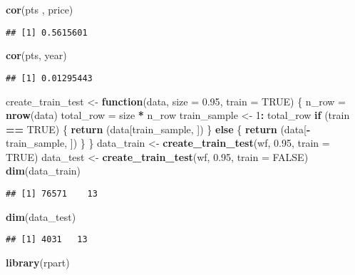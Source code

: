 \documentclass[
]{article}
\newenvironment{Shaded}{\begin{snugshade}}{\end{snugshade}}
\newcommand{\ControlFlowTok}[1]{\textcolor[rgb]{0.13,0.29,0.53}{\textbf{#1}}}
\newcommand{\DataTypeTok}[1]{\textcolor[rgb]{0.13,0.29,0.53}{#1}}
\newcommand{\DecValTok}[1]{\textcolor[rgb]{0.00,0.00,0.81}{#1}}
\newcommand{\FloatTok}[1]{\textcolor[rgb]{0.00,0.00,0.81}{#1}}
\newcommand{\KeywordTok}[1]{\textcolor[rgb]{0.13,0.29,0.53}{\textbf{#1}}}
\newcommand{\NormalTok}[1]{#1}
\newcommand{\OperatorTok}[1]{\textcolor[rgb]{0.81,0.36,0.00}{\textbf{#1}}}
\newcommand{\OtherTok}[1]{\textcolor[rgb]{0.56,0.35,0.01}{#1}}
\newcommand{\StringTok}[1]{\textcolor[rgb]{0.31,0.60,0.02}{#1}}
\begin{document}
\begin{Shaded}
\begin{Highlighting}[]
\KeywordTok{cor}\NormalTok{(pts , price)}
\end{Highlighting}
\end{Shaded}

\begin{verbatim}
## [1] 0.5615601
\end{verbatim}

\begin{Shaded}
\begin{Highlighting}[]
\KeywordTok{cor}\NormalTok{(pts, year)}
\end{Highlighting}
\end{Shaded}

\begin{verbatim}
## [1] 0.01295443
\end{verbatim}

\begin{Shaded}
\begin{Highlighting}[]
\NormalTok{create_train_test <-}\StringTok{ }\ControlFlowTok{function}\NormalTok{(data, }\DataTypeTok{size =} \FloatTok{0.95}\NormalTok{, }\DataTypeTok{train =} \OtherTok{TRUE}\NormalTok{) \{}
\NormalTok{     n_row =}\StringTok{ }\KeywordTok{nrow}\NormalTok{(data)}
\NormalTok{     total_row =}\StringTok{ }\NormalTok{size }\OperatorTok{*}\StringTok{ }\NormalTok{n_row}
\NormalTok{     train_sample <-}\StringTok{ }\DecValTok{1}\OperatorTok{:}\StringTok{ }\NormalTok{total_row}
     \ControlFlowTok{if}\NormalTok{ (train }\OperatorTok{==}\StringTok{ }\OtherTok{TRUE}\NormalTok{) \{}
         \KeywordTok{return}\NormalTok{ (data[train_sample, ])}
\NormalTok{     \} }\ControlFlowTok{else}\NormalTok{ \{}
         \KeywordTok{return}\NormalTok{ (data[}\OperatorTok{-}\NormalTok{train_sample, ])}
\NormalTok{     \}}
\NormalTok{ \}}
\NormalTok{data_train <-}\StringTok{ }\KeywordTok{create_train_test}\NormalTok{(wf, }\FloatTok{0.95}\NormalTok{, }\DataTypeTok{train =} \OtherTok{TRUE}\NormalTok{)}
\NormalTok{data_test <-}\StringTok{ }\KeywordTok{create_train_test}\NormalTok{(wf, }\FloatTok{0.95}\NormalTok{, }\DataTypeTok{train =} \OtherTok{FALSE}\NormalTok{)}
\KeywordTok{dim}\NormalTok{(data_train)}
\end{Highlighting}
\end{Shaded}

\begin{verbatim}
## [1] 76571    13
\end{verbatim}

\begin{Shaded}
\begin{Highlighting}[]
\KeywordTok{dim}\NormalTok{(data_test)}
\end{Highlighting}
\end{Shaded}

\begin{verbatim}
## [1] 4031   13
\end{verbatim}

\begin{Shaded}
\begin{Highlighting}[]
\KeywordTok{library}\NormalTok{(rpart)}
\end{Highlighting}
\end{Shaded}
\end{document}
